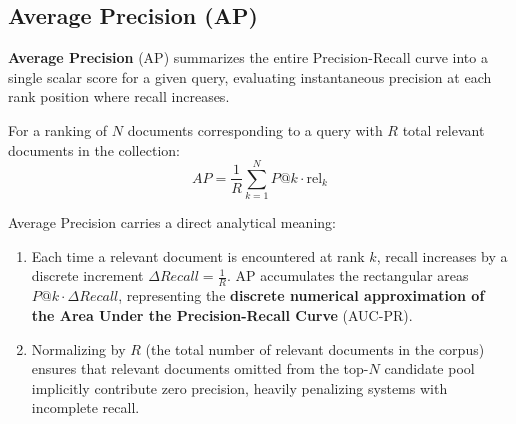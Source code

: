 \subsection{Average Precision (AP)}
\textbf{Average Precision} (AP) summarizes the entire Precision-Recall curve into a single scalar score for a given query, evaluating instantaneous precision at each rank position where recall increases.

\begin{definition}
For a ranking of $N$ documents corresponding to a query with $R$ total relevant documents in the collection:
\begin{equation}
AP = \frac{1}{R} \sum_{k=1}^N P@k \cdot \mathrm{rel}_k
\end{equation}
\end{definition}

\begin{property}
Average Precision carries a direct analytical meaning:
\begin{enumerate}
    \item Each time a relevant document is encountered at rank $k$, recall increases by a discrete increment $\Delta Recall = \frac{1}{R}$. AP accumulates the rectangular areas $P@k \cdot \Delta Recall$, representing the \textbf{discrete numerical approximation of the Area Under the Precision-Recall Curve} (AUC-PR).
    \item Normalizing by $R$ (the total number of relevant documents in the corpus) ensures that relevant documents omitted from the top-$N$ candidate pool implicitly contribute zero precision, heavily penalizing systems with incomplete recall.
\end{enumerate}
\end{property}

